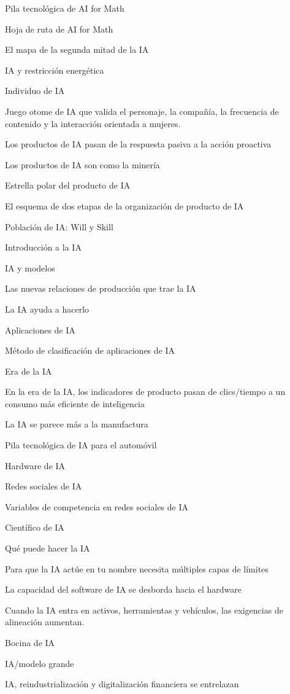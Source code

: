 \documentclass{article}
\begin{document}
Pila tecnológica de AI for Math

Hoja de ruta de AI for Math

El mapa de la segunda mitad de la IA

IA y restricción energética

Individuo de IA

Juego otome de IA que valida el personaje, la compañía, la frecuencia de contenido y la interacción orientada a mujeres.

Los productos de IA pasan de la respuesta pasiva a la acción proactiva

Los productos de IA son como la minería

Estrella polar del producto de IA

El esquema de dos etapas de la organización de producto de IA

Población de IA: Will y Skill

Introducción a la IA

IA y modelos

Las nuevas relaciones de producción que trae la IA

La IA ayuda a hacerlo

Aplicaciones de IA

Método de clasificación de aplicaciones de IA

Era de la IA

En la era de la IA, los indicadores de producto pasan de clics/tiempo a un consumo más eficiente de inteligencia

La IA se parece más a la manufactura

Pila tecnológica de IA para el automóvil

Hardware de IA

Redes sociales de IA

Variables de competencia en redes sociales de IA

Científico de IA

Qué puede hacer la IA

Para que la IA actúe en tu nombre necesita múltiples capas de límites

La capacidad del software de IA se desborda hacia el hardware

Cuando la IA entra en activos, herramientas y vehículos, las exigencias de alineación aumentan.

Bocina de IA

IA/modelo grande

IA, reindustrialización y digitalización financiera se entrelazan
\end{document}

